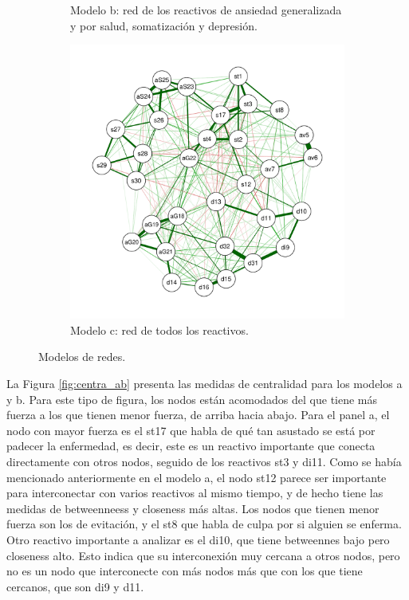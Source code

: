 \documentclass[11pt,spanish]{article}\usepackage[]{graphicx}\usepackage[]{color}
\begin{document}
\begin{figure}
\begin{subfigure}{0.45\textwidth}
    \caption{Modelo b: red de los reactivos de ansiedad generalizada y por salud, somatización y depresión.}
    \label{fig:netdean}
\end{subfigure}
\hfill
\begin{subfigure}{0.7\textwidth}
    \includegraphics[width=\textwidth]{images/net_todo.pdf}
    \caption{Modelo c: red de todos los reactivos.}
    \label{fig:nettodos}
\end{subfigure}
\caption{Modelos de redes.}
\label{fig:nets}
\end{figure}

\newpage

La Figura \ref{fig:centra_ab} presenta las medidas de centralidad para los modelos a y b. Para este tipo de figura, los nodos están acomodados del que tiene más fuerza a los que tienen menor fuerza, de arriba hacia abajo. Para el panel a, el nodo con mayor fuerza es el st17 que habla de qué tan asustado se está por padecer la enfermedad, es decir, este es un reactivo importante que conecta directamente con otros nodos, seguido de los reactivos st3 y di11. Como se había mencionado anteriormente en el modelo a, el nodo st12 parece ser importante para interconectar con varios reactivos al mismo tiempo, y de hecho tiene las medidas de betweenneess y closeness más altas. Los nodos que tienen menor fuerza son los de evitación, y el st8 que habla de culpa por si alguien se enferma. Otro reactivo importante a analizar es el di10, que tiene betweennes bajo pero closeness alto. Esto indica que su interconexión muy cercana a otros nodos, pero no es un nodo que interconecte con más nodos más que con los que tiene cercanos, que son di9 y d11.
\end{document}

